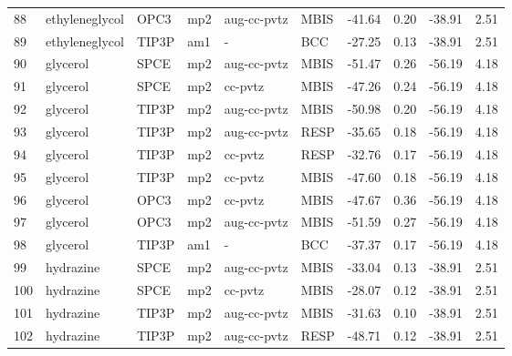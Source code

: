 \begin{tabular}{llllllrrrr}
88  &                 ethyleneglycol &       OPC3 &      mp2 &  aug-cc-pvtz &         MBIS & -41.64 &      0.20 &      -38.91 &     2.51 \\
89  &                 ethyleneglycol &      TIP3P &      am1 &            - &          BCC & -27.25 &      0.13 &      -38.91 &     2.51 \\
90  &                       glycerol &       SPCE &      mp2 &  aug-cc-pvtz &         MBIS & -51.47 &      0.26 &      -56.19 &     4.18 \\
91  &                       glycerol &       SPCE &      mp2 &      cc-pvtz &         MBIS & -47.26 &      0.24 &      -56.19 &     4.18 \\
92  &                       glycerol &      TIP3P &      mp2 &  aug-cc-pvtz &         MBIS & -50.98 &      0.20 &      -56.19 &     4.18 \\
93  &                       glycerol &      TIP3P &      mp2 &  aug-cc-pvtz &         RESP & -35.65 &      0.18 &      -56.19 &     4.18 \\
94  &                       glycerol &      TIP3P &      mp2 &      cc-pvtz &         RESP & -32.76 &      0.17 &      -56.19 &     4.18 \\
95  &                       glycerol &      TIP3P &      mp2 &      cc-pvtz &         MBIS & -47.60 &      0.18 &      -56.19 &     4.18 \\
96  &                       glycerol &       OPC3 &      mp2 &      cc-pvtz &         MBIS & -47.67 &      0.36 &      -56.19 &     4.18 \\
97  &                       glycerol &       OPC3 &      mp2 &  aug-cc-pvtz &         MBIS & -51.59 &      0.27 &      -56.19 &     4.18 \\
98  &                       glycerol &      TIP3P &      am1 &            - &          BCC & -37.37 &      0.17 &      -56.19 &     4.18 \\
99  &                      hydrazine &       SPCE &      mp2 &  aug-cc-pvtz &         MBIS & -33.04 &      0.13 &      -38.91 &     2.51 \\
100 &                      hydrazine &       SPCE &      mp2 &      cc-pvtz &         MBIS & -28.07 &      0.12 &      -38.91 &     2.51 \\
101 &                      hydrazine &      TIP3P &      mp2 &  aug-cc-pvtz &         MBIS & -31.63 &      0.10 &      -38.91 &     2.51 \\
102 &                      hydrazine &      TIP3P &      mp2 &  aug-cc-pvtz &         RESP & -48.71 &      0.12 &      -38.91 &     2.51 \\

\end{tabular}
